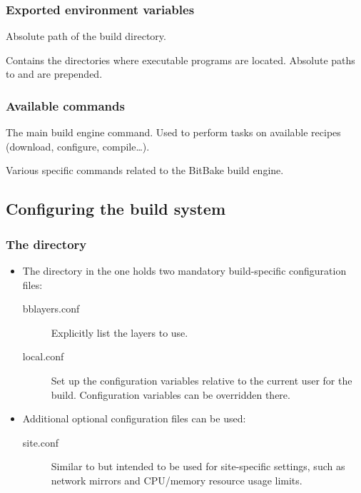 \begin{frame}
  \frametitle{Exported environment variables}
  \begin{description}[style=nextline]
    \item[BUILDDIR] Absolute path of the build directory.
    \item[PATH] Contains the directories where executable programs are
      located. Absolute paths to  and
       are prepended.
  \end{description}
\end{frame}

\begin{frame}
  \frametitle{Available commands}
  \begin{description}[style=nextline]
    \item[bitbake] The main build engine command. Used to perform
      tasks on available recipes (download, configure, compile\dots).
    \item[bitbake-*] Various specific commands related to the BitBake
      build engine.
  \end{description}
\end{frame}

\subsection{Configuring the build system}

\begin{frame}
  \frametitle{The  directory}
  \begin{itemize}
    \item The  directory in the  one holds two
      mandatory build-specific configuration files:
    \begin{description}
      \item[bblayers.conf] Explicitly list the layers to use.
      \item[local.conf] Set up the configuration variables relative to
        the current user for the build. Configuration variables can be
        overridden there.
    \end{description}
    \item Additional optional configuration files can be used:
    \begin{description}
      \item[site.conf] Similar to  but intended to be used
        for site-specific settings, such as network mirrors and CPU/memory
        resource usage limits.
    \end{description}
  \end{itemize}
\end{frame}

